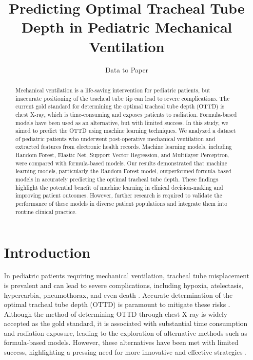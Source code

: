 \documentclass[11pt]{article}
\title{Predicting Optimal Tracheal Tube Depth in Pediatric Mechanical Ventilation}
\author{Data to Paper}
\begin{document}
\maketitle
\begin{abstract}
Mechanical ventilation is a life-saving intervention for pediatric patients, but inaccurate positioning of the tracheal tube tip can lead to severe complications. The current gold standard for determining the optimal tracheal tube depth (OTTD) is chest X-ray, which is time-consuming and exposes patients to radiation. Formula-based models have been used as an alternative, but with limited success. In this study, we aimed to predict the OTTD using machine learning techniques. We analyzed a dataset of pediatric patients who underwent post-operative mechanical ventilation and extracted features from electronic health records. Machine learning models, including Random Forest, Elastic Net, Support Vector Regression, and Multilayer Perceptron, were compared with formula-based models. Our results demonstrated that machine learning models, particularly the Random Forest model, outperformed formula-based models in accurately predicting the optimal tracheal tube depth. These findings highlight the potential benefit of machine learning in clinical decision-making and improving patient outcomes. However, further research is required to validate the performance of these models in diverse patient populations and integrate them into routine clinical practice.
\end{abstract}
\section*{Introduction}

In pediatric patients requiring mechanical ventilation, tracheal tube misplacement is prevalent and can lead to severe complications, including hypoxia, atelectasis, hypercarbia, pneumothorax, and even death \cite{Baumeister1997EvaluationOP, Wolfler2011DailyPO, Traiber2009ProfileAC, Rost2022TrachealTM}. Accurate determination of the optimal tracheal tube depth (OTTD) is paramount to mitigate these risks \cite{Mosier2015ThePD}. Although the method of determining OTTD through chest X-ray is widely accepted as the gold standard, it is associated with substantial time consumption and radiation exposure, leading to the exploration of alternative methods such as formula-based models. However, these alternatives have been met with limited success, highlighting a pressing need for more innovative and effective strategies \cite{Mariano2005ACO,Takita2003TheHF, Tareerath2021AccuracyOA}.
\end{document}
